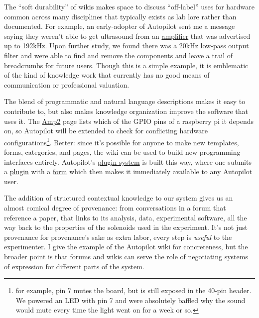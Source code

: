 \documentclass[10pt]{article}
\begin{document}
\begin{multicols}{2}
The ``soft durability'' of wikis makes space to discuss ``off-label''
uses for hardware common across many disciplines that typically exists
as lab lore rather than documented. For example, an early-adopter of
Autopilot sent me a message saying they weren't able to get ultrasound
from an
\href{https://wiki.auto-pi-lot.com/index.php/HiFiBerry_Amp2}{amplifier}
that was advertised up to 192kHz. Upon further study, we found there was
a 20kHz low-pass output filter and were able to find and remove the
components and leave a trail of breadcrumbs for future users. Though
this is a simple example, it is emblematic of the kind of knowledge work
that currently has no good means of communication or professional
valuation.

The blend of programmatic and natural language descriptions makes it
easy to contribute to, but also makes knowledge organization improve the
software that uses it. The
\href{https://wiki.auto-pi-lot.com/index.php/HiFiBerry_Amp2}{Amp2} page
lists which of the GPIO pins of a raspberry pi it depends on, so
Autopilot will be extended to check for conflicting hardware
configurations\footnote{for example, pin 7 mutes the board, but is still
  exposed in the 40-pin header. We powered an LED with pin 7 and were
  absolutely baffled why the sound would mute every time the light went
  on for a week or so.}. Better: since it's possible for anyone to make
new templates, forms, categories, and pages, the wiki can be used to
build new programming interfaces entirely. Autopilot's
\href{https://docs.auto-pi-lot.com/en/latest/guide/plugins.html}{plugin
system} is built this way, where one submits a
\href{https://wiki.auto-pi-lot.com/index.php/Autopilot_Plugins}{plugin}
with a
\href{https://wiki.auto-pi-lot.com/index.php/Form:Autopilot_Plugin}{form}
which then makes it immediately available to any Autopilot user.

The addition of structured contextual knowledge to our system gives us
an almost comical degree of provenance: from conversations in a forum
that reference a paper, that links to its analysis, data, experimental
software, all the way back to the properties of the solenoids used in
the experiment. It's not just provenance for provenance's sake as extra
labor, every step is \emph{useful} to the experimenter. I give the
example of the Autopilot wiki for concreteness, but the broader point is
that forums and wikis can serve the role of negotiating systems of
expression for different parts of the system.


\end{multicols}
\end{document}
